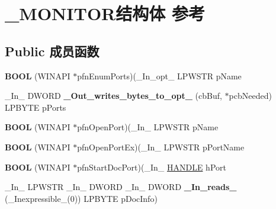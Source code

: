 \hypertarget{struct___m_o_n_i_t_o_r}{}\section{\+\_\+\+M\+O\+N\+I\+T\+O\+R结构体 参考}
\label{struct___m_o_n_i_t_o_r}
\subsection*{Public 成员函数}
\begin{DoxyCompactItemize}
\item 
\mbox{\label{struct___m_o_n_i_t_o_r_aeda02a35a80555d5bcf677e264f74700}} 
{\bfseries B\+O\+OL} (W\+I\+N\+A\+PI $\ast$pfn\+Enum\+Ports)(\+\_\+\+In\+\_\+opt\+\_\+ L\+P\+W\+S\+TR p\+Name
\item 
\mbox{\label{struct___m_o_n_i_t_o_r_a84cd462fe70f11a45c468c269c03947b}} 
\+\_\+\+In\+\_\+ D\+W\+O\+RD {\bfseries \+\_\+\+Out\+\_\+writes\+\_\+bytes\+\_\+to\+\_\+opt\+\_\+} (cb\+Buf, $\ast$pcb\+Needed) L\+P\+B\+Y\+TE p\+Ports
\item 
\mbox{\label{struct___m_o_n_i_t_o_r_a0eaf306bc6d59f2843cf687c01b93bed}} 
{\bfseries B\+O\+OL} (W\+I\+N\+A\+PI $\ast$pfn\+Open\+Port)(\+\_\+\+In\+\_\+ L\+P\+W\+S\+TR p\+Name
\item 
\mbox{\label{struct___m_o_n_i_t_o_r_a495aef9087839f47f05dfbccc2854276}} 
{\bfseries B\+O\+OL} (W\+I\+N\+A\+PI $\ast$pfn\+Open\+Port\+Ex)(\+\_\+\+In\+\_\+ L\+P\+W\+S\+TR p\+Port\+Name
\item 
\mbox{\label{struct___m_o_n_i_t_o_r_a6b204fc96ee5af5d0f6d5aff2c135280}} 
{\bfseries B\+O\+OL} (W\+I\+N\+A\+PI $\ast$pfn\+Start\+Doc\+Port)(\+\_\+\+In\+\_\+ \hyperlink{interfacevoid}{H\+A\+N\+D\+LE} h\+Port
\item 
\mbox{\label{struct___m_o_n_i_t_o_r_ae4c47cdcf43c37e00d02e01e0cb15757}} 
\+\_\+\+In\+\_\+ L\+P\+W\+S\+TR \+\_\+\+In\+\_\+ D\+W\+O\+RD \+\_\+\+In\+\_\+ D\+W\+O\+RD {\bfseries \+\_\+\+In\+\_\+reads\+\_\+} (\+\_\+\+Inexpressible\+\_\+(0)) L\+P\+B\+Y\+TE p\+Doc\+Info)
\item 
\mbox{\label{struct___m_o_n_i_t_o_r_a7dde993e27aed8bcde0b09ff2c0327c9}} 

\end{DoxyCompactItemize}
